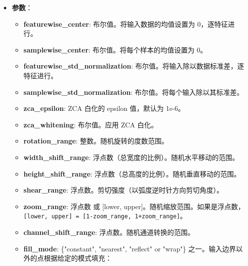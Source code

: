 \begin{itemize}
\tightlist
\item
  \textbf{参数}：

  \begin{itemize}
  \tightlist
  \item
    \textbf{featurewise\_center}: 布尔值。将输入数据的均值设置为
    0，逐特征进行。
  \item
    \textbf{samplewise\_center}: 布尔值。将每个样本的均值设置为 0。
  \item
    \textbf{featurewise\_std\_normalization}:
    布尔值。将输入除以数据标准差，逐特征进行。
  \item
    \textbf{samplewise\_std\_normalization}:
    布尔值。将每个输入除以其标准差。
  \item
    \textbf{zca\_epsilon}: ZCA 白化的 epsilon 值，默认为 1e-6。
  \item
    \textbf{zca\_whitening}: 布尔值。应用 ZCA 白化。
  \item
    \textbf{rotation\_range}: 整数。随机旋转的度数范围。
  \item
    \textbf{width\_shift\_range}:
    浮点数（总宽度的比例）。随机水平移动的范围。
  \item
    \textbf{height\_shift\_range}:
    浮点数（总高度的比例）。随机垂直移动的范围。
  \item
    \textbf{shear\_range}:
    浮点数。剪切强度（以弧度逆时针方向剪切角度）。
  \item
    \textbf{zoom\_range}: 浮点数 或 {[}lower,
    upper{]}。随机缩放范围。如果是浮点数，\texttt{{[}lower,\ upper{]}\ =\ {[}1-zoom\_range,\ 1+zoom\_range{]}}。
  \item
    \textbf{channel\_shift\_range}: 浮点数。随机通道转换的范围。
  \item
    \textbf{fill\_mode}: \{"constant", "nearest", "reflect" or "wrap"\}
    之一。输入边界以外的点根据给定的模式填充：


\end{itemize}
\end{itemize}
